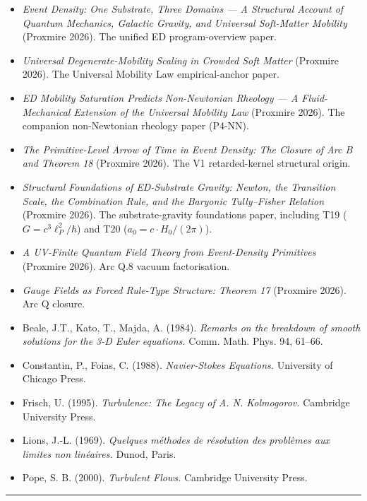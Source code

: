 \documentclass[
]{article}
\providecommand{\tightlist}{%
  \setlength{\itemsep}{0pt}\setlength{\parskip}{0pt}}
\begin{document}
\begin{itemize}
\tightlist
\item
  \emph{Event Density: One Substrate, Three Domains --- A Structural
  Account of Quantum Mechanics, Galactic Gravity, and Universal
  Soft-Matter Mobility} (Proxmire 2026). The unified ED program-overview
  paper.
\item
  \emph{Universal Degenerate-Mobility Scaling in Crowded Soft Matter}
  (Proxmire 2026). The Universal Mobility Law empirical-anchor paper.
\item
  \emph{ED Mobility Saturation Predicts Non-Newtonian Rheology --- A
  Fluid-Mechanical Extension of the Universal Mobility Law} (Proxmire
  2026). The companion non-Newtonian rheology paper (P4-NN).
\item
  \emph{The Primitive-Level Arrow of Time in Event Density: The Closure
  of Arc B and Theorem 18} (Proxmire 2026). The V1 retarded-kernel
  structural origin.
\item
  \emph{Structural Foundations of ED-Substrate Gravity: Newton, the
  Transition Scale, the Combination Rule, and the Baryonic Tully--Fisher
  Relation} (Proxmire 2026). The substrate-gravity foundations paper,
  including T19 (\(G = c^3 \ell_P^2/\hbar\)) and T20
  (\(a_0 = c \cdot H_0/(2\pi)\)).
\item
  \emph{A UV-Finite Quantum Field Theory from Event-Density Primitives}
  (Proxmire 2026). Arc Q.8 vacuum factorisation.
\item
  \emph{Gauge Fields as Forced Rule-Type Structure: Theorem 17}
  (Proxmire 2026). Arc Q closure.
\item
  Beale, J.T., Kato, T., Majda, A. (1984). \emph{Remarks on the
  breakdown of smooth solutions for the 3-D Euler equations.} Comm.
  Math. Phys. 94, 61--66.
\item
  Constantin, P., Foias, C. (1988). \emph{Navier-Stokes Equations.}
  University of Chicago Press.
\item
  Frisch, U. (1995). \emph{Turbulence: The Legacy of A. N. Kolmogorov.}
  Cambridge University Press.
\item
  Lions, J.-L. (1969). \emph{Quelques méthodes de résolution des
  problèmes aux limites non linéaires.} Dunod, Paris.
\item
  Pope, S. B. (2000). \emph{Turbulent Flows.} Cambridge University
  Press.
\end{itemize}

\begin{center}\rule{0.5\linewidth}{0.5pt}\end{center}
\end{document}
